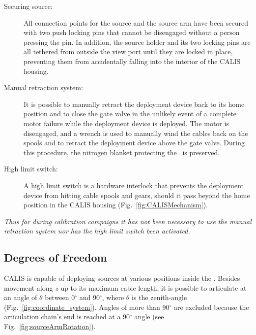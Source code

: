\begin{description}
\item[Securing source:] 
All connection points for the source and the source arm have been secured with two push locking pins that cannot be disengaged without a person pressing the pin. In addition, the source holder and its two locking pins are all tethered from outside the view port until they are locked in place, preventing them from accidentally falling into the interior of the CALIS housing.

\item[Manual retraction system:]
It is possible to manually retract the deployment device back to its home position and to close the gate valve in the unlikely event of a complete motor failure while the deployment device is deployed. The motor is disengaged, and a wrench is used to manually wind the cables back on the spools and to retract the deployment device above the gate valve. During this procedure, the nitrogen blanket protecting the \lsv\ is preserved. 
   
\item[High limit switch:]
A high limit switch is a hardware interlock that prevents the deployment device from hitting cable spools and gears, should it pass beyond the home position in the CALIS housing (Fig.~\ref{fig:CALISMechanism}). 
\end{description}

\textit{Thus far during calibration campaigns it has not been necessary to use the manual retraction system nor has the high limit switch been activated.}

	

\subsection{Degrees of Freedom}

CALIS is capable of deploying sources at various positions inside the \lsv. Besides movement along $z$ up to its maximum cable length, it is possible to articulate at an angle of $\theta$ between 0$^{\circ}$ and 90$^{\circ}$, where $\theta$ is the zenith-angle (Fig.~\ref{fig:coordinate_system}). Angles of more than 90$^{\circ}$ are excluded because the articulation chain's end is reached at a 90$^{\circ}$ angle (see Fig.~\ref{fig:sourceArmRotation}).

